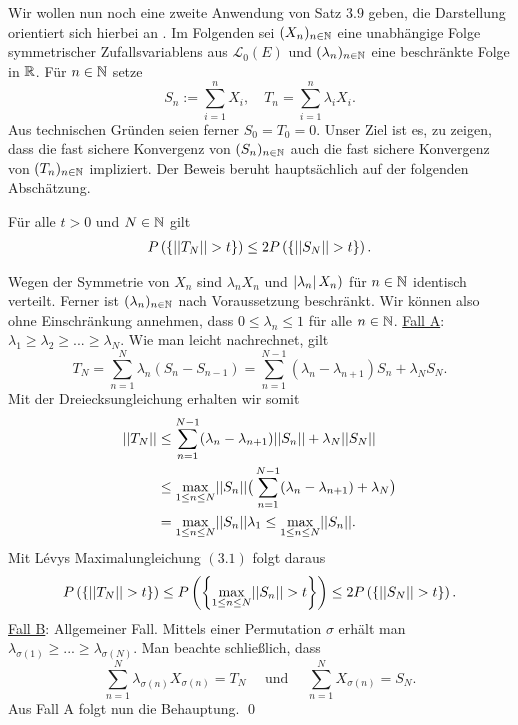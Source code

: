 Wir wollen nun noch eine zweite Anwendung von Satz $3.9$ geben, die Darstellung orientiert sich hierbei an \cite{li-queffelec}. 
Im Folgenden sei $(X_n)_{n \in \mathbb{N}}$ eine unabhängige Folge symmetrischer Zufallsvariablens aus $\mathcal{L}_0(E)$ und $(\lambda_n)_{n \in \mathbb{N}}$ eine beschränkte Folge in $\mathbb{R}$. 
Für $n \in \mathbb{N}$ setze
$$
    S_n := \sum_{i=1}^nX_i, \quad T_n = \sum_{i=1}^n\lambda_iX_i. 
$$
Aus technischen Gründen seien ferner $S_0 = T_0 = 0$. 
Unser Ziel ist es, zu zeigen, dass die fast sichere Konvergenz von $(S_n)_{n \in \mathbb{N}}$ auch die fast sichere Konvergenz von $(T_n)_{n \in \mathbb{N}}$ impliziert. 
Der Beweis beruht hauptsächlich auf der folgenden Abschätzung. 
\begin{lemma}
    Für alle $t > 0$ und $N \in \mathbb{N}$ gilt
    \begin{align}
        P\left(\left\{ \lvert\lvert T_N \rvert\rvert > t \right\}\right) \leq 2 P\left(\left\{ \lvert\lvert S_N \rvert\rvert > t \right\}\right). 
    \end{align}
\end{lemma}

\begin{proof*}
    Wegen der Symmetrie von $X_n$ sind $\lambda_n X_n$ und $\left| \lambda_n \right|X_n)$ für $n \in \mathbb{N}$ identisch verteilt. Ferner ist $(\lambda_n)_{n \in \mathbb{N}}$ nach Voraussetzung beschränkt. 
    Wir können also ohne Einschränkung annehmen, dass $0 \leq \lambda_n \leq 1$ für alle $n \in \mathbb{N}$. 
    \newline 
    \underline{Fall A}: $\lambda_1 \geq \lambda_2 \geq... \geq \lambda_N$. 
    \newline 
    Wie man leicht nachrechnet, gilt  
    $$
        T_N = \sum_{n=1}^N \lambda_n(S_n - S_{n-1}) = \sum_{n=1}^{N-1}(\lambda_n - \lambda_{n+1})S_n + \lambda_N S_N. 
    $$
    Mit der Dreiecksungleichung erhalten wir somit
    \begin{align*}
        \lvert\lvert T_N \rvert\rvert &\leq \sum_{n=1}^{N-1}(\lambda_n - \lambda_{n+1})\lvert\lvert S_n \rvert\rvert + \lambda_N \lvert\lvert S_N \rvert\rvert \\\
                   &\leq \max_{1 \leq n \leq N}\lvert\lvert S_n \rvert\rvert \big(\sum_{n=1}^{N-1}(\lambda_n - \lambda_{n+1}) + \lambda_N\big) \\\
                   &= \max_{1\leq n \leq N}\lvert\lvert S_n \rvert\rvert \lambda_1 \leq \max_{1\leq n \leq N}\lvert\lvert S_n \rvert\rvert.
    \end{align*}
    Mit Lévys Maximalungleichung $(3.1)$ folgt daraus
    $$
        P\left(\left\{ \lvert\lvert T_N \rvert\rvert > t \right\}\right) \leq P\left(\left\{ \max_{1 \leq n \leq N}\lvert\lvert S_n \rvert\rvert > t \right\}\right) \leq 2 P\left(\left\{ \lvert\lvert S_N \rvert\rvert > t \right\}\right).
    $$
    \underline{Fall B}: Allgemeiner Fall. 
    \newline 
    Mittels einer Permutation $\sigma$ erhält man $\lambda_{\sigma(1)} \geq ... \geq \lambda_{\sigma(N)}$. Man beachte schließlich, dass 
    $$
        \sum_{n=1}^N\lambda_{\sigma(n)}X_{\sigma(n)} = T_N \quad \text{ und } \quad \sum_{n=1}^N X_{\sigma(n)} = S_N.
    $$ 
    Aus Fall A folgt nun die Behauptung. \qed
\end{proof*}

